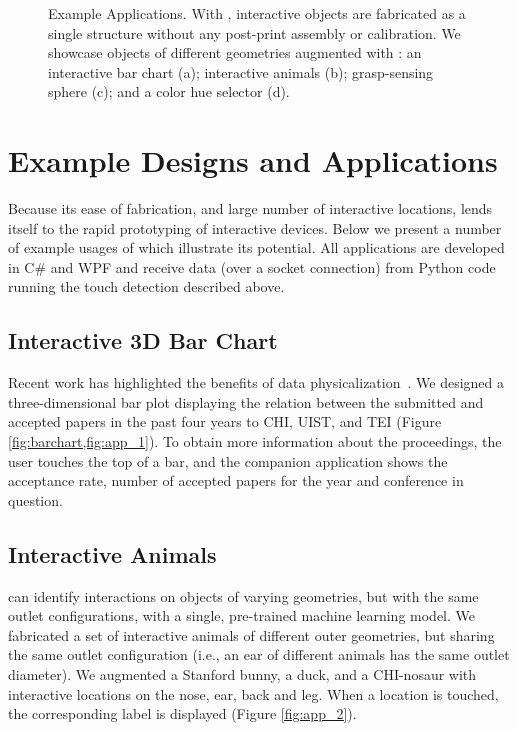 			\begin{figure*}[h]
				\centering
				 \hfill
				\caption{Example \at Applications. With \at, interactive objects are
					fabricated as a single structure without any post-print assembly or
					calibration. We showcase objects of different geometries augmented with
					\at: an interactive bar chart (a); interactive animals (b);
					grasp-sensing sphere (c); and a color hue selector (d).}
				\label{fig:apps}
			\end{figure*}

	\section{Example Designs and Applications}
		Because its ease of fabrication, and large number of interactive locations,
		\at lends itself to the rapid prototyping of interactive devices. Below we
		present a number of example usages of \at which illustrate its potential.
		All applications are developed in C\# and WPF and receive data (over a
		socket connection) from Python code running the touch detection described
		above.
		
		\subsection*{Interactive 3D Bar Chart}
			Recent work has highlighted the benefits of data
			physicalization~\cite{Jansen:2015cu}. We designed a three-dimensional bar
			plot displaying the relation between the submitted and accepted papers in
			the past four years to CHI, UIST, and TEI (Figure
			\ref{fig:barchart,fig:app_1}).  To obtain more information about the
			proceedings, the user touches the top of a bar, and the companion
			application shows the acceptance rate, number of accepted papers for the
			year and conference in question.
		    
		\subsection*{Interactive Animals}
			\at can identify interactions on objects of varying geometries, but with
			the same outlet configurations, with a single, pre-trained machine
			learning model. We fabricated a set of interactive animals of different
			outer geometries, but sharing the same outlet configuration (i.e., an
			ear of different animals has the same outlet diameter). We augmented a
			Stanford bunny, a duck, and a CHI-nosaur with interactive locations on
			the nose, ear, back and leg. When a location is touched, the
			corresponding label is displayed (Figure \ref{fig:app_2}).
		    
